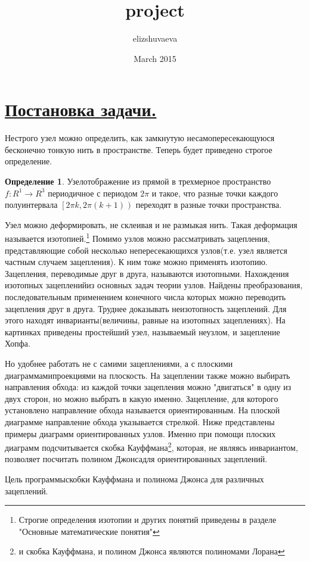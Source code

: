 \documentclass{article}
\title{project}
\author{elizshuvaeva }
\date{March 2015}
\theoremstyle{theorem}
\theoremstyle{definition}
\newtheorem{defi}[theo]{Определение}
\begin{document}
\section{\underline{Постановка задачи.}}

{Нестрого узел можно определить, как замкнутую несамопересекающуюся бесконечно тонкую нить в пространстве.
Теперь будет приведено строгое определение.}

\begin{defi}
Узел отображение из прямой в трехмерное пространство $f:{R^1\to R^3}$ периодичное с периодом $2\pi$ и такое, что разные точки каждого полуинтервала $\left [2\pi k,2\pi (k+1)^{}\right )$ переходят в разные точки пространства.
\end{defi}
{Узел можно деформировать, не склеивая и не размыкая нить. Такая деформация называется изотопией.\footnote[1]{Строгие определения изотопии и других понятий приведены в разделе "Основные математические понятия"} Помимо узлов можно рассматривать зацепления, представляющие собой несколько непересекающихся узлов(т.е. узел является частным случаем зацепления). К ним тоже можно применять изотопию. Зацепления, переводимые друг в друга, называются изотопными. Нахождения изотопных зацеплений из основных задач теории узлов. Найдены преобразования, последовательным применением конечного числа которых можно переводить зацепления друг в друга. Труднее доказывать неизотопность зацеплений. Для этого находят инварианты(величины, равные на изотопных зацеплениях). На картинках приведены простейший узел, называемый неузлом, и зацепление Хопфа.

Но удобнее работать не с самими зацеплениями, а с плоскими диаграммами проекциями на плоскость. На зацеплении также можно выбирать направления обхода: из каждой точки зацепления можно "двигаться" в одну из двух сторон, но можно выбрать в какую именно. Зацепление, для которого установлено направление обхода называется ориентированным. На плоской диаграмме направление обхода указывается стрелкой. Ниже представлены примеры диаграмм ориентированных узлов. Именно при помощи плоских диаграмм подсчитывается скобка Кауффмана\footnote[2]{и скобка Кауффмана, и полином Джонса являются полиномами Лорана}, которая, не являясь инвариантом, позволяет посчитать полином Джонса для ориентированных зацеплений.

Цель программы скобки Кауффмана и полинома Джонса для различных зацеплений.}
\end{document}
